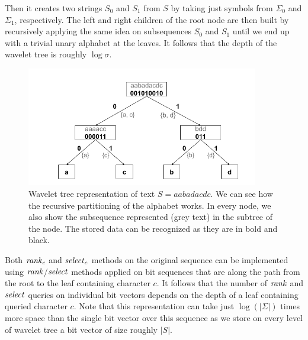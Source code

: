 Then it creates two strings $S_0$ and $S_1$ from $S$ by taking just symbols
from $\Sigma_0$ and $\Sigma_1$, respectively. The left and right children of the root node
are then built by recursively applying the same idea on subsequences $S_0$ and $S_1$ until
we end up with a trivial unary alphabet at the leaves. It follows that the depth of the
wavelet tree is roughly $\log \sigma$.
\begin{figure}
	\centerline{
		\includegraphics[width=0.9\textwidth, height=0.3\textheight]{images/wavelet_tree}
	}
	\caption[TODO]{Wavelet tree representation of text $S=\mathit{aabadacdc}$. We can see how
	the recursive partitioning of the alphabet works. In every node, we also show the
	subsequence represented (grey text) in the subtree of the node. The stored data can be
	recognized as they are in bold and black.
	}
	\label{obr:WaveletTreeExample}
\end{figure}
Both $\mathit{rank}_c$ and $\mathit{select}_c$ methods on the original sequence can be implemented
using $\mathit{rank}$/$\mathit{select}$ methods applied on bit sequences that are along the path
from the root to the leaf containing character $c$. It follows that the number of
$\mathit{rank}$ and $\mathit{select}$ queries on individual bit vectors depends on the depth of
a leaf containing queried character $c$. Note that this representation can take
just $\log(|\Sigma|)$ times more space than the single bit vector over this sequence
as we store on every level of wavelet tree a bit vector of size roughly $|S|$.


